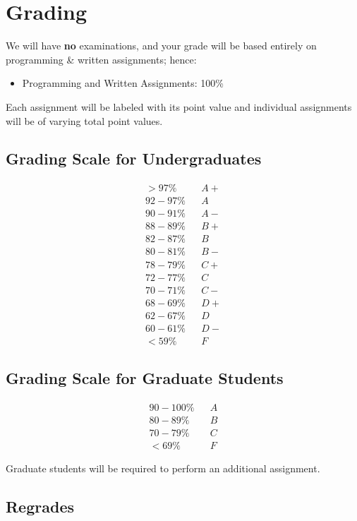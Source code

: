 \documentclass[11pt]{article}
\begin{document}
\section{Grading}

We will have {\bf no} examinations, and your grade will be based entirely on programming \& written assignments; hence:
\begin{itemize}
\item Programming and Written Assignments: 100\%
\end{itemize}
Each assignment will be labeled with its point value and individual assignments will be of varying total point values.

\subsection*{Grading Scale for Undergraduates}
\[
\begin{array}{lcl}
> 97\%	&&A+ \\
92-97\%	&&A \\
90-91\%	&&A- \\
88-89\%	&&B+ \\
82-87\%	&&B \\
80-81\%	&&B- \\
78-79\%	&&C+ \\
72-77\%	&&C \\
70-71\%	&&C- \\
68-69\%	&&D+ \\
62-67\%	&&D \\
60-61\%	&&D- \\
< 59\%	&&F
\end{array}
\]

\subsection*{Grading Scale for Graduate Students} 

\[
\begin{array}{lcl}
90-100\%	&&A\\
80-89\%	&&B\\
70-79\%	&&C\\
< 69\%	&&F
\end{array}
\]

Graduate students will be required to perform an additional assignment.

\subsection*{Regrades}
\end{document}
